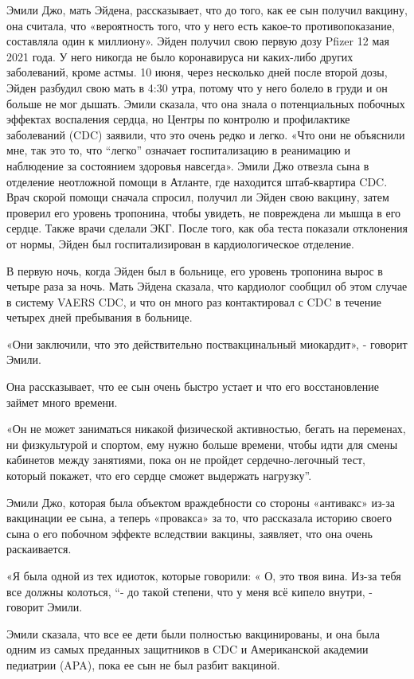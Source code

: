 Эмили Джо, мать Эйдена, рассказывает, что до того, как ее сын получил вакцину,
она считала, что «вероятность того, что у него есть какое-то противопоказание,
составляла один к миллиону». Эйден получил свою первую дозу Pfizer 12 мая 2021
года. У него никогда не было коронавируса ни каких-либо других заболеваний,
кроме астмы. 10 июня, через несколько дней после второй дозы, Эйден разбудил
свою мать в 4:30 утра, потому что у него болело в груди и он больше не мог
дышать. Эмили сказала, что она знала о потенциальных побочных эффектах
воспаления сердца, но Центры по контролю и профилактике заболеваний (CDC)
заявили, что это очень редко и легко. «Что они не объяснили мне, так это то, что
“легко” означает госпитализацию в реанимацию и наблюдение за состоянием здоровья
навсегда». Эмили Джо отвезла сына в отделение неотложной помощи в Атланте, где
находится штаб-квартира CDC. Врач скорой помощи сначала спросил, получил ли
Эйден свою вакцину, затем проверил его уровень тропонина, чтобы увидеть, не
повреждена ли мышца в его сердце. Также врачи сделали ЭКГ. После того, как оба
теста показали отклонения от нормы, Эйден был госпитализирован в
кардиологическое отделение.

В первую ночь, когда Эйден был в больнице, его уровень тропонина вырос в четыре
раза за ночь. Мать Эйдена сказала, что кардиолог сообщил об этом случае в
систему VAERS CDC, и что он много раз контактировал с CDC в течение четырех дней
пребывания в больнице.

«Они заключили, что это действительно поствакцинальный миокардит», - говорит
Эмили.

Она рассказывает, что ее сын очень быстро устает и что его восстановление займет
много времени.

«Он не может заниматься никакой физической активностью, бегать на переменах, ни
физкультурой и спортом, ему нужно больше времени, чтобы идти для смены кабинетов
между занятиями, пока он не пройдет сердечно-легочный тест, который покажет, что
его сердце сможет выдержать нагрузку”.

Эмили Джо, которая была объектом враждебности со стороны «антивакс» из-за
вакцинации ее сына, а теперь «провакса» за то, что рассказала историю своего
сына о его побочном эффекте вследствии вакцины, заявляет, что она очень
раскаивается.

«Я была одной из тех идиоток, которые говорили: « О, это твоя вина. Из-за тебя
все должны колоться, “- до такой степени, что у меня всё кипело внутри, -
говорит Эмили.

Эмили сказала, что все ее дети были полностью вакцинированы, и она была одним из
самых преданных защитников в CDC и Американской академии педиатрии (APA), пока
ее сын не был разбит вакциной.

